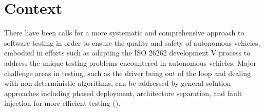 
  
  


\chapter{Context}
\label{Context} 

There have been calls for a more systematic and comprehensive approach to software testing in order to ensure the quality and safety of autonomous vehicles, embodied in efforts such as adapting the ISO 26262 development V process to address the unique testing problems encountered in autonomous vehicles. Major challenge areas in testing, such as the driver being out of the loop and dealing with non-deterministic algorithms, can be addressed by general solution approaches including phased deployment, architecture separation, and fault injection for more efficient testing (\cite{koopman2016challenges}).

